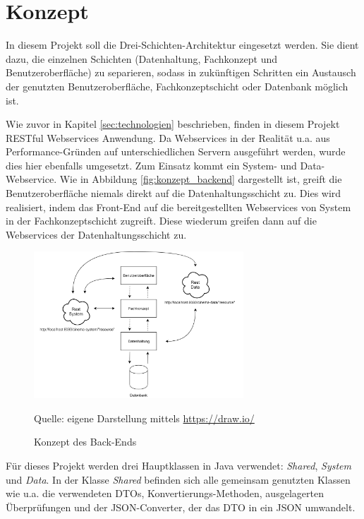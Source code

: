 \section{Konzept}
\label{sec:konzept}

In diesem Projekt soll die Drei-Schichten-Architektur eingesetzt werden.
Sie dient dazu, die einzelnen Schichten (Datenhaltung, Fachkonzept und Benutzeroberfläche) zu separieren, sodass in zukünftigen Schritten ein Austausch der genutzten Benutzeroberfläche, Fachkonzeptschicht oder Datenbank möglich ist.

Wie zuvor in Kapitel \vref{sec:technologien} beschrieben, finden in diesem Projekt \acs{REST}ful Webservices Anwendung.
Da Webservices in der Realität u.a. aus Performance-Gründen auf unterschiedlichen Servern ausgeführt werden, wurde dies hier ebenfalls umgesetzt.
Zum Einsatz kommt ein System- und Data-Webservice.
Wie in Abbildung \vref{fig:konzept_backend} dargestellt ist, greift die Benutzeroberfläche niemals direkt auf die Datenhaltungsschicht zu.
Dies wird realisiert, indem das Front-End auf die bereitgestellten Webservices von System in der Fachkonzeptschicht zugreift.
Diese wiederum greifen dann auf die Webservices der Datenhaltungsschicht zu.

\begin{figure}[ht]
	\centering
	\includegraphics[width=0.7\textwidth]{img/backend/rest}
	\captionsetup{format=hang}
	\caption{Konzept des Back-Ends}
	\small Quelle: eigene Darstellung mittels \url{https://draw.io/}
	\label{fig:konzept_backend}
	\end{figure}

Für dieses Projekt werden drei Hauptklassen in Java verwendet: \textit{Shared}, \textit{System} und \textit{Data}.
In der Klasse \textit{Shared} befinden sich alle gemeinsam genutzten Klassen wie u.a. die verwendeten \acp{DTO}, Konvertierungs-Methoden, ausgelagerten Überprüfungen und der \acs{JSON}-Converter, der das \acs{DTO} in ein \acs{JSON} umwandelt.

